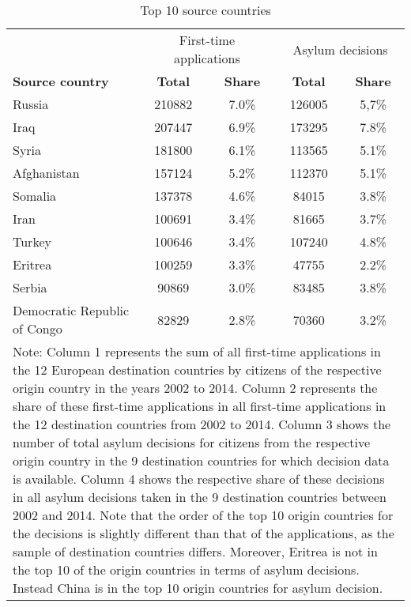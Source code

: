 
\begin{table}[!ht]\centering \footnotesize
\caption{Top 10 source countries}
\begin{tabular}{l c c c c}
\hline \hline
& \multicolumn{2}{c}{First-time applications} & \multicolumn{2}{c}{Asylum decisions}  \\
\textbf{Source country} & \textbf{Total} & \textbf{Share}  & \textbf{Total} & \textbf{Share} \\
\hline 
\smallskip
Russia & 210882 & 7.0\% & 126005 & 5,7\% \\
\smallskip
Iraq & 207447 & 6.9\%  & 173295 & 7.8\% \\
\smallskip
Syria & 181800 & 6.1\%  & 113565 & 5.1\%  \\
\smallskip
Afghanistan & 157124 & 5.2\% & 112370 & 5.1\% \\
\smallskip
Somalia & 137378 & 4.6\% & 84015 & 3.8\%  \\
\smallskip
Iran & 100691 & 3.4\% & 81665 & 3.7\%  \\
\smallskip
Turkey  & 100646 & 3.4\% & 107240 & 4.8\% \\
\smallskip 
Eritrea & 100259 & 3.3\% & 47755 & 2.2\% \\
\smallskip
Serbia & 90869 & 3.0\% & 83485 & 3.8\% \\
\smallskip
Democratic Republic of Congo  & 82829 & 2.8\% &70360 & 3.2\% \\
\hline \hline
\multicolumn{5}{p{12.5cm}}{Note: Column 1 represents the sum of all first-time applications in the 12 European destination countries by citizens of the respective origin country in the years 2002 to 2014. Column 2 represents the share of these first-time applications in all first-time applications in the 12 destination countries from 2002 to 2014. Column 3 shows the number of total asylum decisions for citizens from the respective origin country in the 9 destination countries for which decision data is available. Column 4 shows the respective share of these decisions in all asylum decisions taken in the 9 destination countries between 2002 and 2014. Note that the order of the top 10 origin countries for the decisions is slightly different than that of the applications, as the sample of destination countries differs. Moreover, Eritrea is not in the top 10 of the origin countries in terms of asylum decisions. Instead China is in the top 10 origin countries for asylum decision.}
\end{tabular}
\label{origin_countries}
\end{table}